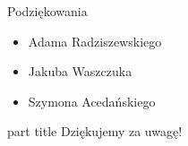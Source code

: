 \documentclass{beamer}
\begin{document}
\begin{frame}{Podziękowania}
  \begin{itemize}
    \item Adama Radziszewskiego
    \item Jakuba Waszczuka
    \item Szymona Acedańskiego
  \end{itemize}
\end{frame}

\begin{frame}{}
\begin{centering}
    \begin{beamercolorbox}[sep=12pt,center]{part title}
    Dziękujemy za uwagę!\par
    \end{beamercolorbox}
    \end{centering}
\end{frame}
\end{document}
